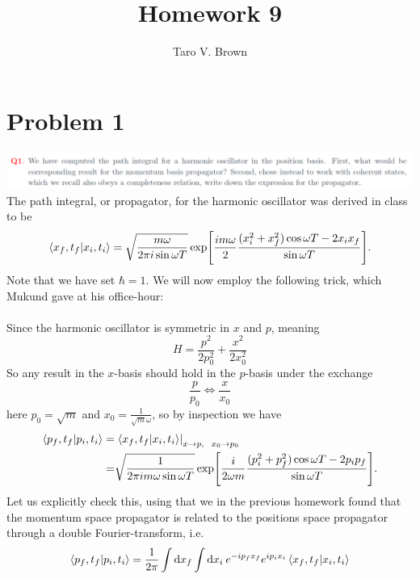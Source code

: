 \documentclass[a4paper,11pt]{article}
\title{Homework 9}
\author{Taro V. Brown}
\begin{document}
 
\maketitle
\flushbottom
\newpage
\section*{Problem 1}
\hspace*{-1cm}\includegraphics[width=0.85\pagewidth]{1.png}
The path integral, or propagator, for the harmonic oscillator was derived in class to be
\begin{equation}
\braket{x_f,t_f}{x_i,t_i}=\sqrt{\frac{m\omega}{2\pi i \sin{\omega T}}}\exp[\frac{i m \omega}{2 }\frac{(x_i^2+x_f^2)\cos{\omega T}-2x_i x_f}{\sin{\omega T}}].
\end{equation}
Note that we have set $\hbar=1$. We will now employ the following trick, which Mukund gave at his office-hour:
\\\\
Since the harmonic oscillator is symmetric in $x$ and $p$, meaning
\begin{equation}
H=\frac{p^2}{2p_0^2}+\frac{x^2}{2x_0^2}
\end{equation}
So any result in the $x$-basis should hold in the $p$-basis under the exchange
\begin{equation}
\frac{p}{p_0}\Leftrightarrow\frac{x}{x_0}
\end{equation}
here $p_0=\sqrt{m}$ and $x_0=\frac{1}{\sqrt{m}\omega}$, so by inspection we have
\begin{equation} \label{eq:p-kernel}
\begin{aligned}
\braket{p_f,t_f}{p_i,t_i}=&\left.	\braket{x_f,t_f}{x_i,t_i}\right|_{x\to p,~~x_0\to p_0}\\
=&\sqrt{\frac{1}{2 \pi i m \omega \sin{\omega T}}}\exp[\frac{i}{2\omega m }\frac{(p_i^2+p_f^2)\cos{\omega T}-2p_i p_f}{\sin{\omega T}}].
\end{aligned}
\end{equation}
Let us explicitly check this, using that we in the previous homework found that the momentum space propagator is related to the positions space propagator through a double Fourier-transform, i.e.
\begin{equation}
\braket{p_f,t_f}{p_i,t_i}=\frac{1}{2\pi}\int\dd x_f \int  \dd x_i \: e^{-ip_fx_f} e^{ip_ix_i} \braket{x_f,t_f}{x_i,t_i}
\end{equation}
\end{document}
